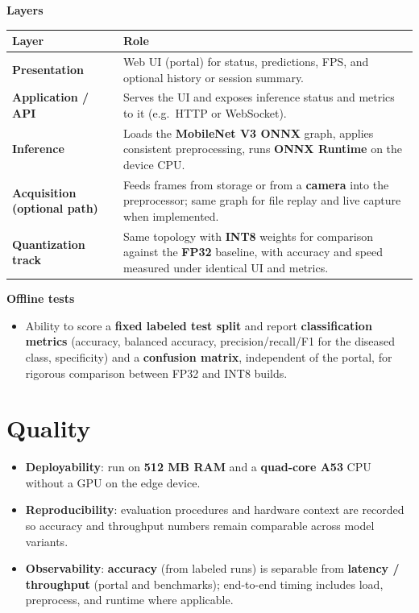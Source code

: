 \documentclass[a4paper,onesided,12pt]{report}
\begin{document}
\textbf{Layers}

\begin{table}[h!]
\begin{center}
\begin{tabular}{|l|p{9cm}|}
\hline
\textbf{Layer} & \textbf{Role} \\
\hline
\textbf{Presentation} & Web UI (portal) for status, predictions, FPS, and optional history or session summary. \\
\hline
\textbf{Application / API} & Serves the UI and exposes inference status and metrics to it (e.g.\ HTTP or WebSocket). \\
\hline
\textbf{Inference} & Loads the \textbf{MobileNet V3 ONNX} graph, applies consistent preprocessing, runs \textbf{ONNX Runtime} on the device CPU. \\
\hline
\textbf{Acquisition (optional path)} & Feeds frames from storage or from a \textbf{camera} into the preprocessor; same graph for file replay and live capture when implemented. \\
\hline
\textbf{Quantization track} & Same topology with \textbf{INT8} weights for comparison against the \textbf{FP32} baseline, with accuracy and speed measured under identical UI and metrics. \\
\hline
\end{tabular}
\end{center}
\end{table}

\textbf{Offline tests}

\begin{itemize}
\item Ability to score a \textbf{fixed labeled test split} and report \textbf{classification metrics} (accuracy, balanced accuracy, precision/recall/F1 for the diseased class, specificity) and a \textbf{confusion matrix}, independent of the portal, for rigorous comparison between FP32 and INT8 builds.
\end{itemize}

\section{Quality}

\begin{itemize}
\item \textbf{Deployability}: run on \textbf{512 MB RAM} and a \textbf{quad-core A53} CPU without a GPU on the edge device.
\item \textbf{Reproducibility}: evaluation procedures and hardware context are recorded so accuracy and throughput numbers remain comparable across model variants.
\item \textbf{Observability}: \textbf{accuracy} (from labeled runs) is separable from \textbf{latency / throughput} (portal and benchmarks); end-to-end timing includes load, preprocess, and runtime where applicable.
\end{itemize}
\end{document}
